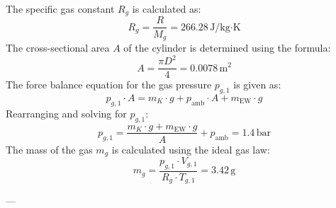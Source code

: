 The specific gas constant \( R_g \) is calculated as:  
\[
R_g = \frac{R}{M_g} = 266.28 \, \text{J/kg·K}
\]  
The cross-sectional area \( A \) of the cylinder is determined using the formula:  
\[
A = \frac{\pi D^2}{4} = 0.0078 \, \text{m}^2
\]  
The force balance equation for the gas pressure \( p_{g,1} \) is given as:  
\[
p_{g,1} \cdot A = m_K \cdot g + p_{\text{amb}} \cdot A + m_{\text{EW}} \cdot g
\]  
Rearranging and solving for \( p_{g,1} \):  
\[
p_{g,1} = \frac{m_K \cdot g + m_{\text{EW}} \cdot g}{A} + p_{\text{amb}} = 1.4 \, \text{bar}
\]  
The mass of the gas \( m_g \) is calculated using the ideal gas law:  
\[
m_g = \frac{p_{g,1} \cdot V_{g,1}}{R_g \cdot T_{g,1}} = 3.42 \, \text{g}
\]  

---